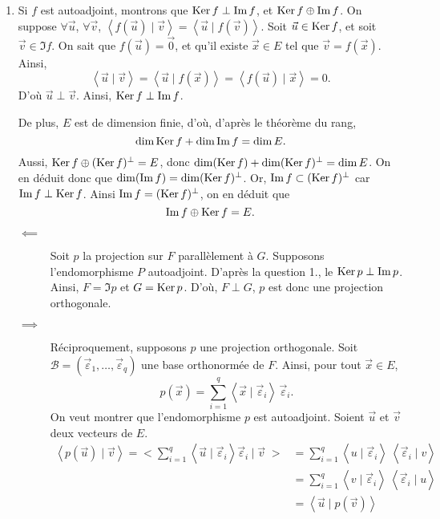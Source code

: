 \begin{exo}
	\begin{enumerate}
		\item Si $f$\/ est autoadjoint, montrons que $\operatorname{Ker} f \perp \operatorname{Im} f$, et $\operatorname{Ker} f \oplus \operatorname{Im} f$.
			On suppose $\forall \vec{u}$, $\forall \vec{v}$, $\left<f(\vec{u}) \mid \vec{v} \right> = \left<\vec{u}  \mid f(\vec{v}) \right>$.
			Soit $\vec{u} \in \operatorname{Ker} f$, et soit $\vec{v} \in \Im f$.
			On sait que $f(\vec{u}) = \vec{0}$, et qu'il existe $\vec{x} \in E$\/ tel que $\vec{v} = f(\vec{x})$.
			Ainsi, \[
				\left<\vec{u}  \mid \vec{v} \right>
				= \left<\vec{u}  \mid f(\vec{x}) \right>
				= \left<f(\vec{u})  \mid \vec{x} \right>
				= 0
			.\] 
			D'où $\vec{u} \perp \vec{v}$. Ainsi, $\operatorname{Ker} f \perp \operatorname{Im} f$.


			De plus, $E$\/ est de dimension finie, d'où, d'après le théorème du rang, \[
				\dim \operatorname{Ker} f + \dim \operatorname{Im} f = \dim E
			.\] Aussi, $\operatorname{Ker} f \oplus (\operatorname{Ker} f)^\perp = E$, donc $\dim(\operatorname{Ker} f) + \dim(\operatorname{Ker} f)^\perp = \dim E$.
			On en déduit donc que $\dim(\operatorname{Im} f)= \dim(\operatorname{Ker} f)^\perp$.
			Or, $\operatorname{Im} f \subset (\operatorname{Ker} f)^\perp$\/ car $\operatorname{Im} f \perp \operatorname{Ker} f$.
			Ainsi $\operatorname{Im} f = (\operatorname{Ker} f)^\perp$, on en déduit que \[
				\operatorname{Im} f \oplus \operatorname{Ker} f = E
			.\]
			\begin{description}
				\item[$\impliedby$] 
					Soit $p$\/ la projection sur $F$\/ parallèlement à $G$.
					Supposons l'endomorphisme $P$\/ autoadjoint.
					D'après la question 1., le $\operatorname{Ker} p \perp \operatorname{Im} p$.
					Ainsi, $F = \Im p$\/ et $G = \operatorname{Ker} p$.
					D'où, $F \perp G$, $p$\/ est donc une projection orthogonale.
				\item[$\implies$]
					Réciproquement, supposons $p$\/ une projection orthogonale.
					Soit $\mathcal{B} = (\vec{\varepsilon}_1, \ldots, \vec{\varepsilon}_q)$\/ une base orthonormée de $F$.
					Ainsi, pour tout $\vec{x} \in E$, \[
						p(\vec{x}) = \sum_{i = 1}^q \left<\vec{x}  \mid \vec{\varepsilon}_i \right>\,\vec{\varepsilon}_i
					.\] 
					On veut montrer que l'endomorphisme $p$\/ est autoadjoint.
					Soient $\vec{u}$\/ et $\vec{v}$\/ deux vecteurs de $E$.
					\begin{align*}
						\left<p(\vec{u})  \mid \vec{v} \right>
						= \Big<\sum_{i=1}^q \left< \vec{u}\mid \vec{\varepsilon}_i \right>\vec{\varepsilon}_i\:\Big|\; \vec{v}\;\Big>
						&= \sum_{i=1}^q \left<u  \mid \vec{\varepsilon}_{i} \right>\: \left< \vec{\varepsilon}_i  \mid v\right>\\
						&= \sum_{i=1}^q \left<v  \mid \vec{\varepsilon}_i \right>\:\left<\vec{\varepsilon}_i   \mid u\right> \\
						&= \left< \vec{u}  \mid p(\vec{v}) \right> \\
					\end{align*}


\end{description}
\end{enumerate}
\end{exo}
